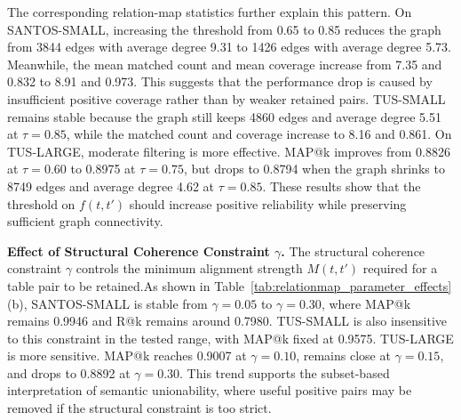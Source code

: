The corresponding relation-map statistics further explain this pattern. On
SANTOS-SMALL, increasing the threshold from 0.65 to 0.85 reduces the graph from
3844 edges with average degree 9.31 to 1426 edges with average degree 5.73.
Meanwhile, the mean matched count and mean coverage increase from 7.35 and
0.832 to 8.91 and 0.973. This suggests that the performance drop is caused by
insufficient positive coverage rather than by weaker retained pairs.
TUS-SMALL remains stable because the graph still keeps 4860 edges and average
degree 5.51 at \(\tau=0.85\), while the matched count and coverage increase to
8.16 and 0.861. On TUS-LARGE, moderate filtering is more effective. MAP@k
improves from 0.8826 at \(\tau=0.60\) to 0.8975 at \(\tau=0.75\), but drops to
0.8794 when the graph shrinks to 8749 edges and average degree 4.62 at
\(\tau=0.85\). These results show that the threshold on \(f(t,t')\) should
increase positive reliability while preserving sufficient graph connectivity.

\textbf{Effect of Structural Coherence Constraint \(\gamma\). }The structural coherence constraint \(\gamma\) controls the minimum alignment
strength \(M(t,t')\) required for a table pair to be retained.As shown in
Table~\ref{tab:relationmap_parameter_effects}(b), SANTOS-SMALL is stable from
\(\gamma=0.05\) to \(\gamma=0.30\), where MAP@k remains 0.9946 and R@k remains
around 0.7980. TUS-SMALL is also insensitive to this constraint in the tested
range, with MAP@k fixed at 0.9575. TUS-LARGE is more sensitive. MAP@k reaches
0.9007 at \(\gamma=0.10\), remains close at \(\gamma=0.15\), and drops to
0.8892 at \(\gamma=0.30\). This trend supports the subset-based interpretation
of semantic unionability, where useful positive pairs may be removed if the
structural constraint is too strict.

